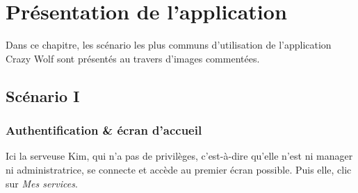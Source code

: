 \chapter[L'application]{Présentation de l'application}

Dans ce chapitre, les scénario les plus communs
 d'utilisation de l'application Crazy Wolf sont 
 présentés au travers d'images commentées.

\section[Authentification \& écran d'accueil - Scénario I]{Scénario I}
\subsection*{Authentification \& écran d'accueil}
Ici la serveuse Kim, qui n'a pas de privilèges, c'est-à-dire qu'elle n'est 
ni manager ni administratrice, se connecte et accède au premier écran possible.
Puis elle, clic sur \textit{Mes services}.


